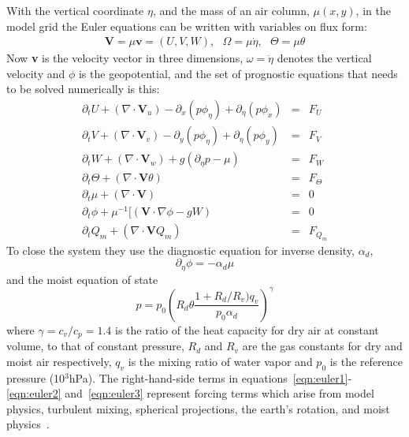 With the vertical coordinate $\eta$, and the mass of an air column, $\mu(x,y)$, in the model grid the Euler equations can be written with  variables on flux form:
\begin{eqnarray*}
\textbf{V} = \mu \textbf{v} = (U,V,W),\textit{    }\Omega = \mu \dot{\eta},\textit{    }\Theta = \mu \theta
\end{eqnarray*}
Now \textbf{v} is the velocity vector in three dimensions, $\omega = \dot{\eta}$ denotes the vertical velocity and $\phi$ is the geopotential, and the set of prognostic equations that needs to be solved numerically is this:
\begin{eqnarray}
\partial_t U + (\nabla \cdot \textbf{V}_u) - \partial_x (p\phi_{\eta}) + \partial_{\eta}(p\phi_x) &=& F_U\\ \label{eqn:euler1}
\partial_t V + (\nabla \cdot \textbf{V}_v) - \partial_y (p\phi_{\eta}) + \partial_{\eta}(p\phi_y) &=& F_V\\
\partial_t W + (\nabla \cdot \textbf{V}_w) + g(\partial_{\eta}p-\mu)&=&F_W\\
\partial_t \Theta + (\nabla \cdot \textbf{V}\theta) &=& F_{\Theta}\\ \label{eqn:euler2}
\partial_t \mu + (\nabla \cdot \textbf{V}) &=& 0\\
\partial_t \phi + \mu^{-1}[(\textbf{V} \cdot \nabla \phi - gW) &=& 0\\
\partial_t Q_m + (\nabla \cdot \textbf{V}Q_m) &=& F_{Q_m} \label{eqn:euler3}
\end{eqnarray}
To close the system they use the diagnostic equation for inverse density, $\alpha_d$,
\begin{equation}
\partial_{\eta} \phi = -\alpha_d \mu
\end{equation}
and the moist equation of state
\begin{equation}
p = p_0\left(R_d\theta\frac{1+R_d/R_v)q_v}{p_0\alpha_d}\right)^{\gamma}
\end{equation}
where $\gamma = c_v/c_p = 1.4$ is the ratio of the heat capacity for dry air at constant volume, to that of constant pressure, $R_d$ and $R_v$ are the gas constants for dry and moist air respectively, $q_v$ is the mixing ratio of water vapor and $p_0$ is the reference pressure (10$^3$hPa). The right-hand-side terms in equations~\ref{eqn:euler1}-\ref{eqn:euler2} and~\ref{eqn:euler3} represent forcing terms which arise from model physics, turbulent mixing, spherical projections, the earth's rotation, and moist physics~\citep{Skamarock2008a}.

